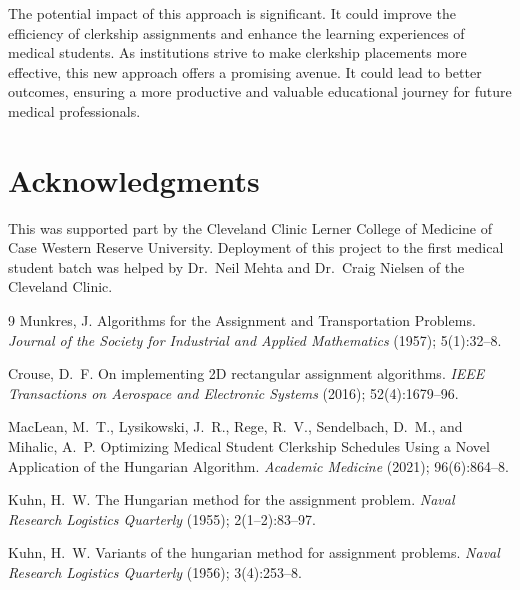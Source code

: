 \documentclass{article}
\begin{document}
The potential impact of this approach is significant. It could improve the efficiency of clerkship assignments and enhance the learning experiences of medical students. As institutions strive to make clerkship placements more effective, this new approach offers a promising avenue. It could lead to better outcomes, ensuring a more productive and valuable educational journey for future medical professionals.

\section*{Acknowledgments}
This was supported part by the Cleveland Clinic Lerner College of Medicine of Case Western Reserve University. Deployment of this project to the first medical student batch was helped by Dr.\ Neil Mehta and Dr.\ Craig Nielsen of the Cleveland Clinic.

\begin{thebibliography}{9}
	Munkres, J.
	\newblock Algorithms for the Assignment and Transportation Problems.
	\newblock \emph{Journal of the Society for Industrial and Applied Mathematics} (1957); 5(1):32--8.

	Crouse, D.~F.
	\newblock On implementing 2D rectangular assignment algorithms.
	\newblock \emph{IEEE Transactions on Aerospace and Electronic Systems} (2016); 52(4):1679--96.

	MacLean, M.~T., Lysikowski, J.~R., Rege, R.~V., Sendelbach, D.~M., and Mihalic, A.~P.
	\newblock Optimizing Medical Student Clerkship Schedules Using a Novel Application of the Hungarian Algorithm.
	\newblock \emph{Academic Medicine} (2021); 96(6):864--8.

	Kuhn, H.~W.
	\newblock The Hungarian method for the assignment problem.
	\newblock \emph{Naval Research Logistics Quarterly} (1955); 2(1--2):83--97.

	Kuhn, H.~W.
	\newblock Variants of the hungarian method for assignment problems.
	\newblock \emph{Naval Research Logistics Quarterly} (1956); 3(4):253--8.
\end{thebibliography}
\end{document}
